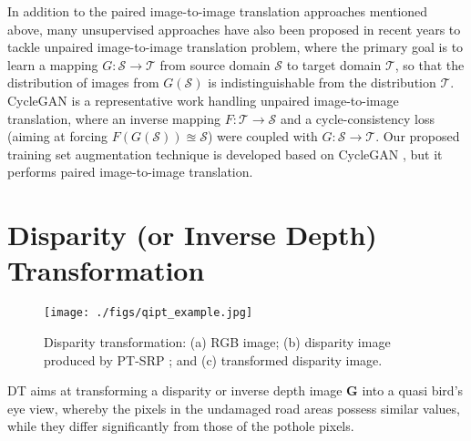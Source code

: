 \documentclass[runningheads]{llncs}
\begin{document}
In addition to the paired image-to-image translation approaches mentioned above, many unsupervised approaches have also been proposed  in recent years to tackle unpaired image-to-image translation problem, where the primary goal is to learn a mapping $G: \mathcal{S}\rightarrow\mathcal{T}$ from source domain $\mathcal{S}$ to target domain $\mathcal{T}$, so that the distribution of images from $G(\mathcal{S})$ is indistinguishable from the distribution $\mathcal{T}$. CycleGAN \cite{zhu2017unpaired} is a representative work handling unpaired image-to-image translation, where an inverse mapping $F:\mathcal{T}\rightarrow\mathcal{S}$ and a cycle-consistency loss (aiming at forcing $F(G(\mathcal{S}))\approxeq \mathcal{S}$) were coupled with $G: \mathcal{S}\rightarrow\mathcal{T}$. Our proposed training set augmentation technique is developed based on CycleGAN \cite{zhu2017unpaired}, but it performs paired image-to-image translation.


\section{Disparity (or Inverse Depth) Transformation}
\label{sec.quasi_dense_inverse_perspective}

\begin{figure*}[t]
    \centering
    \texttt{[image: ./figs/qipt\_example.jpg]}
    \caption{Disparity transformation: (a) RGB image; (b) disparity image produced by PT-SRP \cite{fan2018road}; and (c) transformed disparity image.}
    \label{fig.qipt}
\end{figure*}

DT aims at transforming a disparity or inverse depth image $\mathbf{G}$ into a quasi bird's eye view, whereby the pixels in the undamaged road areas possess similar values, while they differ significantly from those of the pothole pixels.
\end{document}
